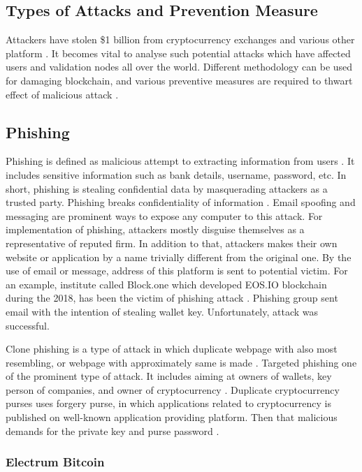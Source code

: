 \documentclass[a4paper,twoside,12pt]{report}
\begin{document}
\begin{spacing}{1.5}
\section{Types of Attacks and Prevention Measure}
\label{typesofattacks}
Attackers have stolen \$1 billion from cryptocurrency exchanges and various other platform \cite{topfiveblockchainsecurityissues}. It becomes vital to analyse such potential attacks which have affected users and validation nodes all over the world. Different methodology can be used for damaging blockchain, and various preventive measures are required to thwart effect of malicious attack \cite{blockchainthreatreport}. 
\subsection{Phishing}
Phishing is defined as malicious attempt to extracting information from users \cite{wiki:phishing}. It includes sensitive information such as bank details, username, password, etc. In short, phishing is stealing confidential data by  masquerading attackers as a trusted party. Phishing breaks confidentiality of information \cite{andryukhinphishing}. Email spoofing and messaging are prominent ways to expose any computer to this attack. For implementation of phishing, attackers mostly disguise themselves as a representative of reputed firm. In addition to that, attackers makes their own website or application by a name trivially different from the original one. By the use of email or message, address of this platform is sent to potential victim. For an example, institute called Block.one which developed EOS.IO blockchain during the 2018, has been the victim of phishing attack \cite{wiki:phishing}. Phishing group sent email with the intention of stealing wallet key. Unfortunately, attack was successful. 
\par
Clone phishing is a type of attack in which duplicate webpage with also most resembling, or webpage with approximately same is made \cite{andryukhinphishing,phishingkaspersky}. Targeted phishing one of the prominent type of attack. It includes aiming at owners of wallets, key person of companies, and owner of cryptocurrency \cite{aimedphising,andryukhinphishing}. Duplicate cryptocurrency purses uses forgery purse, in which applications related to cryptocurrency is published on well-known application providing platform. Then that malicious demands for the private key and purse password \cite{andryukhinphishing}.          
\subsubsection{Electrum Bitcoin}
\cite{phishing_perez_behind_2019}

\end{spacing}
\end{document}
